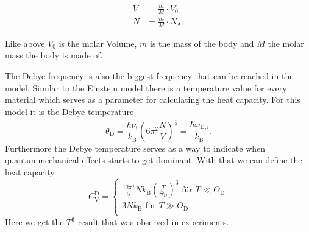 \begin{align}
    V &= \frac{m}{M} \cdot V_0\\ 
    N &= \frac{m}{M} \cdot N_\text{A}.
\end{align}

Like above $V_0$ is the molar Volume, $m$ is the mass of the body and $M$ the molar mass the body is made of.

The Debye frequency is also the biggest frequency that can be reached in the model.
Similar to the Einstein model there is a temperature value for every material which serves as a parameter for calculating the heat capacity.
For this model it is the Debye temperature
\begin{equation}
    \theta_\text{D} = \frac{\hbar \nu_\text{i}}{k_\text{B}} \left(6 \pi^2 \frac{N}{V} \right)^{\frac{1}{3}} = \frac{\hbar \omega_\text{D,i}}{k_\text{B}}.
    \label{eq:debye_temp}
\end{equation}
Furthermore the Debye temperature serves as a way to indicate when quantummechanical effects starts to get dominant. 
With that we can define the heat capacity
\begin{equation}
    C_\text{V}^\text{D} =
      \begin{cases}
        \frac{12 \pi ^4}{5} N k_\text{B} \left( \frac{T}{\Theta_\text{D}}   \right)^3 \,\, \text{für} \,\,  T \ll \Theta_\text{D}\\
        3 N k_\text{B} \,\, \text{für} \,\, T \gg \Theta_\text{D}.\\
        \end{cases}       
\end{equation}
Here we get the $T^3$ result that was observed in experiments.